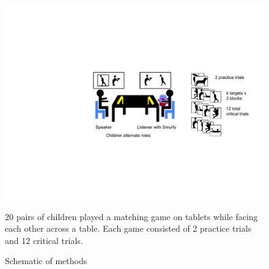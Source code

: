 \documentclass[11pt,a4paper]{article}
\begin{document}
\begin{figure}
	\caption{Schematic of methods}
 \begin{center}{ \includegraphics[width=.8\textwidth, trim={8cm 6cm 1cm 6.4cm}, clip]{exp-diagram.pdf}}
 	\end{center}
 	\begin{small}
 	20 pairs of children played a matching game on tablets while facing each other across a table. Each game consisted of 2 practice trials and 12 critical trials. 
 	\end{small}

\end{figure}
\end{document}
